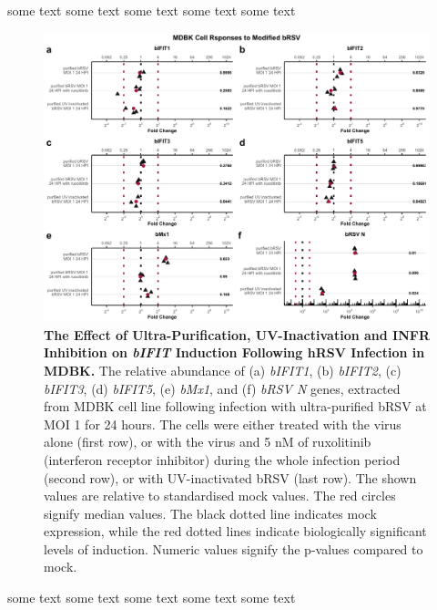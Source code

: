 some text some text some text some text some text

\begin{figure}
    \centering
    \includegraphics[width=1\linewidth]{07. Chapter 2/Figs/02. Induction/04. mdbk_brsv_uv_roxo.pdf}
    \caption[The Effect of Ultra-Purification, UV-Inactivation and INFR Inhibition on \textit{bIFIT} Induction Following hRSV Infection in MDBK.]{\textbf{The Effect of Ultra-Purification, UV-Inactivation and INFR Inhibition on \textit{bIFIT} Induction Following hRSV Infection in MDBK.} The relative abundance of (a) \textit{bIFIT1}, (b) \textit{bIFIT2}, (c) \textit{bIFIT3}, (d) \textit{bIFIT5}, (e) \textit{bMx1}, and (f) \textit{bRSV N} genes, extracted from MDBK cell line following infection with ultra-purified bRSV at MOI 1 for 24 hours. The cells were either treated with the virus alone (first row), or with the virus and 5 nM of ruxolitinib (interferon receptor inhibitor) during the whole infection period (second row), or with UV-inactivated bRSV (last row). The shown values are relative to standardised mock values. The red circles signify median values. The black dotted line indicates mock expression, while the red dotted lines indicate biologically significant levels of induction. Numeric values signify the p-values compared to mock.}
    \label{fig:The effect of ultra-purification, UV-inactivation and INFR inhibition on hIFIT induction following hRSV infection in MDBK}
\end{figure}


some text some text some text some text some text

